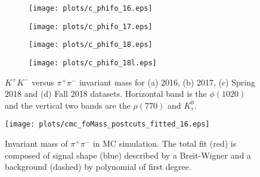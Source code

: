 \begin{figure}[H]
    \centering
    \begin{subfigure}[b]{0.49\textwidth}
        \texttt{[image: plots/c\_phifo\_16.eps]}
        \caption{}
        \label{fig.y2175.xsec_ul.phifo.1.a}
    \end{subfigure}
    \begin{subfigure}[b]{0.49\textwidth}
        \texttt{[image: plots/c\_phifo\_17.eps]}
        \caption{}
        \label{fig.y2175.xsec_ul.phifo.1.b}
    \end{subfigure}
    \begin{subfigure}[b]{0.49\textwidth}
        \texttt{[image: plots/c\_phifo\_18.eps]}
        \caption{}
        \label{fig.y2175.xsec_ul.phifo.1.c}
    \end{subfigure}
    \begin{subfigure}[b]{0.49\textwidth}
        \texttt{[image: plots/c\_phifo\_18l.eps]}
        \caption{}
        \label{fig.y2175.xsec_ul.phifo.1.d}
    \end{subfigure}
    \caption{$K^{+}K^{-}$ versus $\pi^+ \pi^-$ invariant mass for (a) 2016, (b) 2017, (c) Spring 2018 and (d) Fall 2018 datasets. Horizontal band is the $\phi(1020)$ and the vertical two bands are the $\rho(770)$ and $K_{s}^{0}$.}
    \label{fig.y2175.xsec_ul.phifo.1}
\end{figure}

\begin{figure}[H]
    \centering
    \texttt{[image: plots/cmc\_foMass\_postcuts\_fitted\_16.eps]}
    \caption{\label{fig.y2175.xsec_ul.phifo.2}Invariant mass of $\pi^+ \pi^-$ in MC simulation. The total fit (red) is composed of signal shape (blue) described by a Breit-Wigner and a background (dashed) by polynomial of first degree.}
\end{figure}

